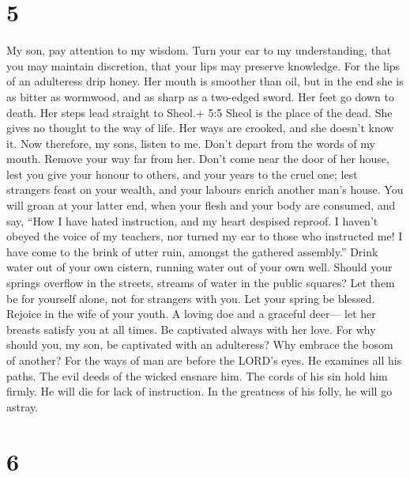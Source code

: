 \hypertarget{section-4}{%
\section{5}\label{section-4}}

 My son, pay attention to my wisdom. Turn your ear to my
understanding,  that you may maintain discretion, that your
lips may preserve knowledge.  For the lips of an adulteress
drip honey. Her mouth is smoother than oil,  but in the end
she is as bitter as wormwood, and as sharp as a two-edged sword.
 Her feet go down to death. Her steps lead straight to
Sheol.+ 5:5 Sheol is the place of the dead.  She gives no
thought to the way of life. Her ways are crooked, and she doesn't know
it.  Now therefore, my sons, listen to me. Don't depart from
the words of my mouth.  Remove your way far from her. Don't
come near the door of her house,  lest you give your honour
to others, and your years to the cruel one;  lest strangers
feast on your wealth, and your labours enrich another man's house.
 You will groan at your latter end, when your flesh and
your body are consumed,  and say, ``How I have hated
instruction, and my heart despised reproof.  I haven't
obeyed the voice of my teachers, nor turned my ear to those who
instructed me!  I have come to the brink of utter ruin,
amongst the gathered assembly.''  Drink water out of your
own cistern, running water out of your own well.  Should
your springs overflow in the streets, streams of water in the public
squares?  Let them be for yourself alone, not for strangers
with you.  Let your spring be blessed. Rejoice in the wife
of your youth.  A loving doe and a graceful deer--- let her
breasts satisfy you at all times. Be captivated always with her love.
 For why should you, my son, be captivated with an
adulteress? Why embrace the bosom of another?  For the ways
of man are before the LORD's eyes. He examines all his paths.
 The evil deeds of the wicked ensnare him. The cords of his
sin hold him firmly.  He will die for lack of instruction.
In the greatness of his folly, he will go astray.

\hypertarget{section-5}{%
\section{6}\label{section-5}}

